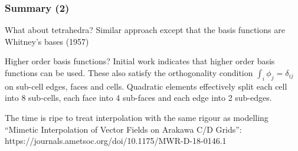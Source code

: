 \documentclass[aspectratio=169]{beamer}
\begin{document}
\begin{frame}[t]
  \frametitle{Summary (2)}
    \begin{block}{What about tetrahedra?}
      Similar approach except that the basis functions are Whitney's bases (1957)
    \end{block}
    \begin{block}{Higher order basis functions?}
    Initial work indicates that higher order basis functions can be used. These also satisfy the orthogonality condition $\int_i \phi_j = \delta_{ij}$
    on sub-cell edges, faces and cells. Quadratic elements effectively 
     split each cell into 8 sub-cells, each face into 4 sub-faces and each edge into 2 sub-edges. 
  \end{block}
    \begin{block}{The time is ripe to treat interpolation with the same rigour as modelling}
    	``Mimetic Interpolation of Vector Fields on Arakawa C/D Grids'': https://journals.ametsoc.org/doi/10.1175/MWR-D-18-0146.1
  \end{block}
\end{frame}
\end{document}
